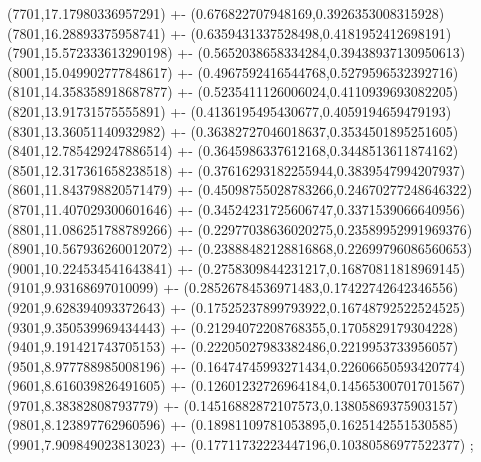 {(7701,17.17980336957291) +- (0.676822707948169,0.3926353008315928)
(7801,16.28893375958741) +- (0.6359431337528498,0.4181952412698191)
(7901,15.572333613290198) +- (0.5652038658334284,0.39438937130950613)
(8001,15.049902777848617) +- (0.4967592416544768,0.5279596532392716)
(8101,14.358358918687877) +- (0.5235411126006024,0.4110939693082205)
(8201,13.91731575555891) +- (0.4136195495430677,0.4059194659479193)
(8301,13.36051140932982) +- (0.36382727046018637,0.3534501895251605)
(8401,12.785429247886514) +- (0.3645986337612168,0.3448513611874162)
(8501,12.317361658238518) +- (0.37616293182255944,0.3839547994207937)
(8601,11.843798820571479) +- (0.45098755028783266,0.24670277248646322)
(8701,11.407029300601646) +- (0.34524231725606747,0.3371539066640956)
(8801,11.086251788789266) +- (0.22977038636020275,0.23589952991969376)
(8901,10.567936260012072) +- (0.23888482128816868,0.22699796086560653)
(9001,10.224534541643841) +- (0.2758309844231217,0.16870811818969145)
(9101,9.93168697010099) +- (0.28526784536971483,0.17422742642346556)
(9201,9.628394093372643) +- (0.17525237899793922,0.16748792522524525)
(9301,9.350539969434443) +- (0.21294072208768355,0.1705829179304228)
(9401,9.191421743705153) +- (0.22205027983382486,0.2219953733956057)
(9501,8.977788985008196) +- (0.16474745993271434,0.22606650593420774)
(9601,8.616039826491605) +- (0.12601232726964184,0.14565300701701567)
(9701,8.38382808793779) +- (0.14516882872107573,0.13805869375903157)
(9801,8.123897762960596) +- (0.18981109781053895,0.1625142551530585)
(9901,7.909849023813023) +- (0.17711732223447196,0.10380586977522377)
};
